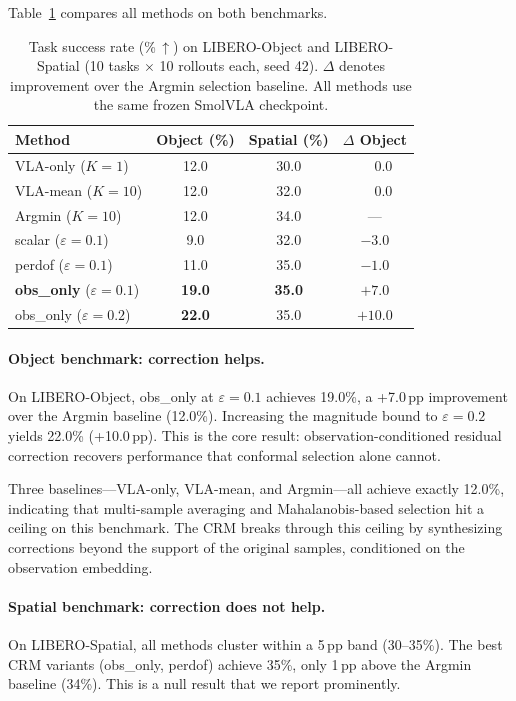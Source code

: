 Table~\ref{tab:main} compares all methods on both benchmarks.

\begin{table}[t]
\centering
\caption{Task success rate (\%\,$\uparrow$) on LIBERO-Object and LIBERO-Spatial (10 tasks $\times$ 10 rollouts each, seed 42). $\Delta$ denotes improvement over the Argmin selection baseline. All methods use the same frozen SmolVLA checkpoint.}
\label{tab:main}
\small
\begin{tabular}{lccc}
\toprule
Method & Object (\%) & Spatial (\%) & $\Delta$ Object \\
\midrule
VLA-only ($K{=}1$)    & 12.0 & 30.0 & $\phantom{+}0.0$ \\
VLA-mean ($K{=}10$)   & 12.0 & 32.0 & $\phantom{+}0.0$ \\
Argmin ($K{=}10$)      & 12.0 & 34.0 & --- \\
\midrule
scalar ($\varepsilon{=}0.1$)  & \phantom{0}9.0 & 32.0 & $-3.0$ \\
perdof ($\varepsilon{=}0.1$)  & 11.0 & 35.0 & $-1.0$ \\
\textbf{obs\_only} ($\varepsilon{=}0.1$) & \textbf{19.0} & \textbf{35.0} & $\mathbf{+7.0}$ \\
\midrule
obs\_only ($\varepsilon{=}0.2$) & \textbf{22.0} & 35.0 & $+10.0$ \\
\bottomrule
\end{tabular}
\end{table}

\paragraph{Object benchmark: correction helps.}
On LIBERO-Object, obs\_only at $\varepsilon{=}0.1$ achieves 19.0\%, a +7.0\,pp improvement over the Argmin baseline (12.0\%).
Increasing the magnitude bound to $\varepsilon{=}0.2$ yields 22.0\% (+10.0\,pp).
This is the core result: observation-conditioned residual correction recovers performance that conformal selection alone cannot.

Three baselines---VLA-only, VLA-mean, and Argmin---all achieve exactly 12.0\%, indicating that multi-sample averaging and Mahalanobis-based selection hit a ceiling on this benchmark.
The CRM breaks through this ceiling by synthesizing corrections beyond the support of the original samples, conditioned on the observation embedding.

\paragraph{Spatial benchmark: correction does not help.}
On LIBERO-Spatial, all methods cluster within a 5\,pp band (30--35\%).
The best CRM variants (obs\_only, perdof) achieve 35\%, only 1\,pp above the Argmin baseline (34\%).
This is a null result that we report prominently.

